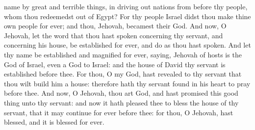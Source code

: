 name by great and terrible things, in driving out nations from before thy people, whom thou redeemedst out of Egypt? For thy people Israel didst thou make thine own people for ever; and thou, Jehovah, becamest their God. And now, O Jehovah, let the word that thou hast spoken concerning thy servant, and concerning his house, be established for ever, and do as thou hast spoken. And let thy name be established and magnified for ever, saying, Jehovah of hosts is the God of Israel, even a God to Israel: and the house of David thy servant is established before thee. For thou, O my God, hast revealed to thy servant that thou wilt build him a house: therefore hath thy servant found in his heart to pray before thee. And now, O Jehovah, thou art God, and hast promised this good thing unto thy servant: and now it hath pleased thee to bless the house of thy servant, that it may continue for ever before thee: for thou, O Jehovah, hast blessed, and it is blessed for ever. 

